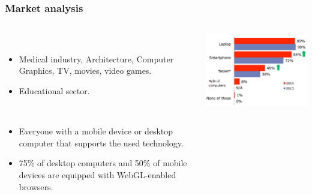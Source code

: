 \begin{frame}
  \frametitle{Market analysis}
 \begin{columns}
    \begin{column}{0.6\textwidth}
      \begin{description}[]
        \item[Industrial Diversity] \hfill \\
        \begin{itemize}
          \item Medical industry, Architecture, Computer Graphics, TV, movies, video games.
          \item Educational sector.
        \end{itemize}

        \item[Wide User base] \hfill \\
          \begin{itemize}
            \item Everyone with a mobile device or desktop computer that supports the used technology.
            \item 75\% of desktop computers and 50\% of mobile devices are equipped with WebGL-enabled browsers.
        \end{itemize}
      \end{description}
    \end{column}

    \begin{column}{0.5\textwidth}
      \includegraphics[width=.9\textwidth]{images/devices.png}\\
    \end{column}
  \end{columns}
\end{frame}

